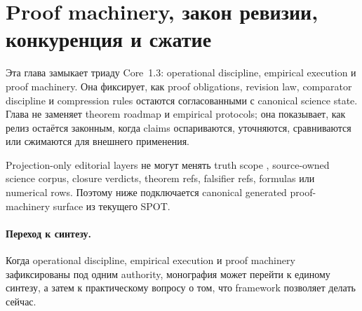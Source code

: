 \section{Proof machinery, закон ревизии, конкуренция и сжатие}
\label{sec:oc-core-1-3-proof-machinery-ru}

Эта глава замыкает триаду Core~1.3: operational discipline, empirical
execution и proof machinery. Она фиксирует, как proof obligations, revision
law, comparator discipline и compression rules остаются согласованными с
canonical science state. Глава не заменяет theorem roadmap и empirical
protocols; она показывает, как релиз остаётся законным, когда claims
оспариваются, уточняются, сравниваются или сжимаются для внешнего применения.

Projection-only editorial layers не могут менять truth scope
, source-owned science corpus, closure verdicts,
theorem refs, falsifier refs, formulas или numerical rows. Поэтому ниже
подключается canonical generated proof-machinery surface из текущего SPOT.



\paragraph{Переход к синтезу.}
Когда operational discipline, empirical execution и proof machinery
зафиксированы под одним authority, монография может перейти к единому
синтезу, а затем к практическому вопросу о том, что framework позволяет делать
сейчас.
